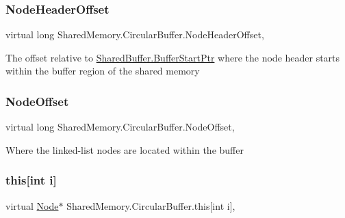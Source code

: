 \subsubsection{\texorpdfstring{Node\+Header\+Offset}{NodeHeaderOffset}}
{\footnotesize\ttfamily virtual long Shared\+Memory.\+Circular\+Buffer.\+Node\+Header\+Offset\hspace{0.3cm}{\ttfamily [get]}, {\ttfamily [protected]}}



The offset relative to \hyperlink{class_shared_memory_1_1_shared_buffer_a2332338ba9693ee545a34faa7c64483a}{Shared\+Buffer.\+Buffer\+Start\+Ptr} where the node header starts within the buffer region of the shared memory 

\mbox{\label{class_shared_memory_1_1_circular_buffer_a551af249ceca9d75331cf72de943a21d}} 
\subsubsection{\texorpdfstring{Node\+Offset}{NodeOffset}}
{\footnotesize\ttfamily virtual long Shared\+Memory.\+Circular\+Buffer.\+Node\+Offset\hspace{0.3cm}{\ttfamily [get]}, {\ttfamily [protected]}}



Where the linked-\/list nodes are located within the buffer 

\mbox{\label{class_shared_memory_1_1_circular_buffer_ab594664b851446512ae4ca11a6d44274}} 
\subsubsection{\texorpdfstring{this[int i]}{this[int i]}}
{\footnotesize\ttfamily virtual \hyperlink{struct_shared_memory_1_1_circular_buffer_1_1_node}{Node}$\ast$ Shared\+Memory.\+Circular\+Buffer.\+this\mbox{[}int i\mbox{]}\hspace{0.3cm}{\ttfamily [get]}, {\ttfamily [protected]}}



